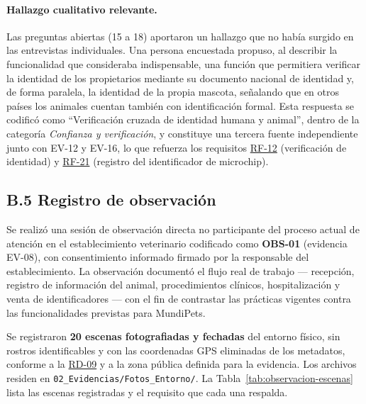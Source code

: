 \documentclass[journal,onecolumn]{IEEEtran}
\begin{document}
	\paragraph{Hallazgo cualitativo relevante.}
	Las preguntas abiertas (15 a 18) aportaron un hallazgo que no había surgido
	en las entrevistas individuales. Una persona encuestada propuso, al describir
	la funcionalidad que consideraba indispensable, una función que permitiera
	verificar la identidad de los propietarios mediante su documento nacional de
	identidad y, de forma paralela, la identidad de la propia mascota, señalando
	que en otros países los animales cuentan también con identificación formal.
	Esta respuesta se codificó como \enquote{Verificación cruzada de identidad
		humana y animal}, dentro de la categoría \emph{Confianza y verificación}, y
	constituye una tercera fuente independiente junto con EV-12 y EV-16, lo que
	refuerza los requisitos \hyperref[tab:RF-12]{RF-12} (verificación de identidad) y \hyperref[tab:RF-21]{RF-21} (registro
	del identificador de microchip).
	
	
	\subsection*{B.5 Registro de observación}
	
	Se realizó una sesión de observación directa no participante del proceso
	actual de atención en el establecimiento veterinario codificado como
	\textbf{OBS-01} (evidencia EV-08), con consentimiento informado firmado por
	la responsable del establecimiento. La observación documentó el flujo real de
	trabajo --- recepción, registro de información del animal, procedimientos
	clínicos, hospitalización y venta de identificadores --- con el fin de
	contrastar las prácticas vigentes contra las funcionalidades previstas para
	MundiPets.
	
	Se registraron \textbf{20 escenas fotografiadas y fechadas} del entorno
	físico, sin rostros identificables y con las coordenadas GPS eliminadas de
	los metadatos, conforme a la \hyperref[tab:RD-09]{RD-09} y a la zona pública definida para la
	evidencia. Los archivos residen en
	\texttt{02\_Evidencias/Fotos\_Entorno/}. La
	Tabla~\ref{tab:observacion-escenas} lista las escenas registradas y el
	requisito que cada una respalda.
	
\end{document}
